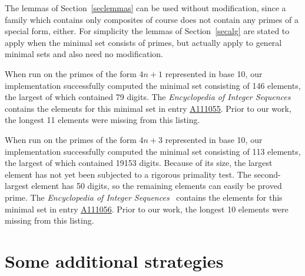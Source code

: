 \documentclass[12pt]{article}
\theoremstyle{plain}
\theoremstyle{definition}
\newcommand{\0}{\mathtt{0}}
\newcommand{\1}{\mathtt{1}}
\newcommand{\2}{\mathtt{2}}
\newcommand{\3}{\mathtt{3}}
\newcommand{\4}{\mathtt{4}}
\newcommand{\5}{\mathtt{5}}
\newcommand{\6}{\mathtt{6}}
\newcommand{\7}{\mathtt{7}}
\newcommand{\8}{\mathtt{8}}
\newcommand{\9}{\mathtt{9}}
\newcommand{\seqnum}[1]{\href{http://oeis.org/#1}{\underline{#1}}}
\begin{document}
The lemmas of Section~\ref{seclemmas} can be used without modification, since a family which contains only composites
of course does not contain any primes of a special form, either.  For simplicity the lemmas of Section~\ref{secalg} are stated
to apply when the minimal set consists of primes, but actually apply to general minimal sets and also need no modification.

When run on the primes of the form $4n+1$ represented in base 10, our implementation successfully computed the minimal set
consisting of 146 elements, the largest of which contained 79 digits.  The 
{\it Encyclopedia of Integer Sequences}~\cite{oeis}
contains the elements for this minimal set in entry \seqnum{A111055}.  Prior to our work, the longest 11 elements were missing
from this listing.

When run on the primes of the form $4n+3$ represented in base 10, our implementation successfully computed the minimal set
consisting of 113 elements, the largest of which contained 19153 digits.  Because of its size, the largest element has not
yet been subjected to a rigorous primality test.  The second-largest element has 50 digits, so the remaining elements
can easily be proved prime.  The {\it Encyclopedia of Integer Sequences}~\cite{oeis}
contains the elements for this minimal set in entry \seqnum{A111056}.  Prior to our work, the longest 10 elements were missing
from this listing.

\section{Some additional strategies}\label{addstrat}
\end{document}
